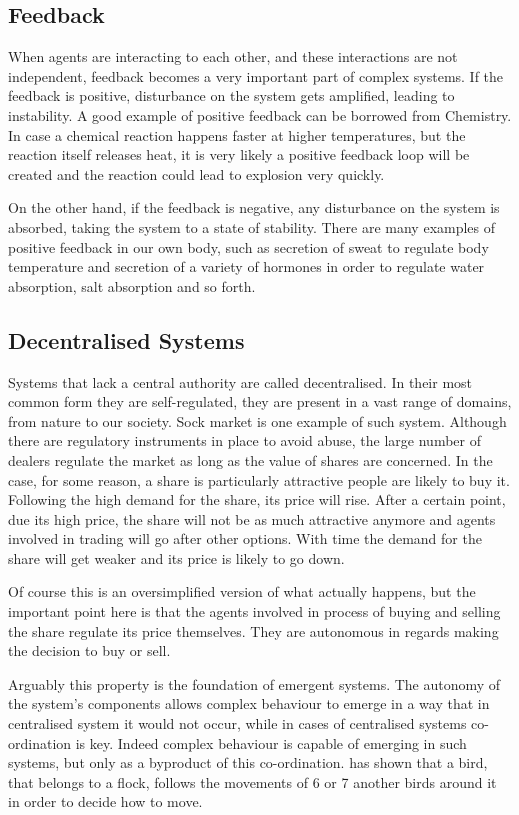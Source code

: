 \subsection{Feedback}
\label{subsec:feedback}

When agents are interacting to each other, and these interactions are not independent, feedback becomes a very important part of complex systems. If the feedback is positive, disturbance on the system gets amplified, leading to instability. A good example of positive feedback can be borrowed from Chemistry. In case a chemical reaction happens faster at higher temperatures, but the reaction itself releases heat, it is very likely a positive feedback loop will be created and the reaction could lead to explosion very quickly.

On the other hand, if the feedback is negative, any disturbance on the system is absorbed, taking the system to a state of stability. There are many examples of positive feedback in our own body, such as secretion of sweat to regulate body temperature and secretion of a variety of hormones in order to regulate water absorption, salt absorption and so forth.  

\subsection{Decentralised Systems}

Systems that lack a central authority are called decentralised. In their most common form they are self-regulated, they are present in a vast range of domains, from nature to our society. Sock market is one example of such system. Although there are regulatory instruments in place to avoid abuse, the large number of dealers regulate the market as long as the value of shares are concerned. In the case, for some reason, a share is particularly attractive people are likely to buy it. Following the high demand for the share, its price will rise. After a certain point, due its high price, the share will not be as much attractive anymore and agents involved in trading will go after other options. With time the demand for the share will get weaker and its price is likely to go down.

Of course this is an oversimplified version of what actually happens, but the important point here is that the agents involved in process of buying and selling the share regulate its price themselves. They are autonomous in regards making the decision to buy or sell.

Arguably this property is the foundation of emergent systems. The autonomy of the system's components allows complex behaviour to emerge in a way that in centralised system it would not occur, while in cases of centralised systems co-ordination is key. Indeed complex behaviour is capable of emerging in such systems, but only as a byproduct of this co-ordination. \citeauthor{ballerini2008interaction} has shown that a bird, that belongs to a flock, follows the movements of 6 or 7 another birds around it in order to decide how to move.

